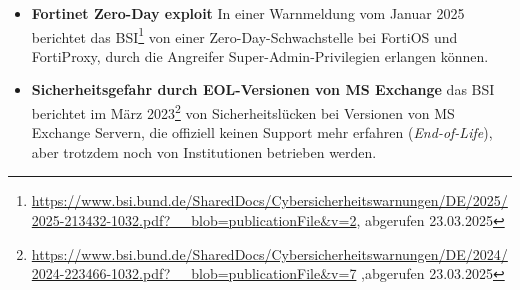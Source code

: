 \begin{itemize}
    \item \textbf{Fortinet Zero-Day exploit} In einer Warnmeldung vom Januar 2025 berichtet das BSI\footnote{
        \url{https://www.bsi.bund.de/SharedDocs/Cybersicherheitswarnungen/DE/2025/2025-213432-1032.pdf?__blob=publicationFile&v=2}, abgerufen 23.03.2025
    } von einer Zero-Day-Schwachstelle bei FortiOS und FortiProxy, durch die Angreifer Super-Admin-Privilegien erlangen können.
    \item \textbf{Sicherheitsgefahr durch EOL-Versionen von MS Exchange} das BSI berichtet im März 2023\footnote{
    \url{https://www.bsi.bund.de/SharedDocs/Cybersicherheitswarnungen/DE/2024/2024-223466-1032.pdf?__blob=publicationFile&v=7} ,abgerufen 23.03.2025
    } von Sicherheitslücken bei Versionen von MS Exchange Servern, die offiziell keinen Support mehr erfahren (\textit{End-of-Life}), aber trotzdem noch von Institutionen betrieben werden.
\end{itemize}